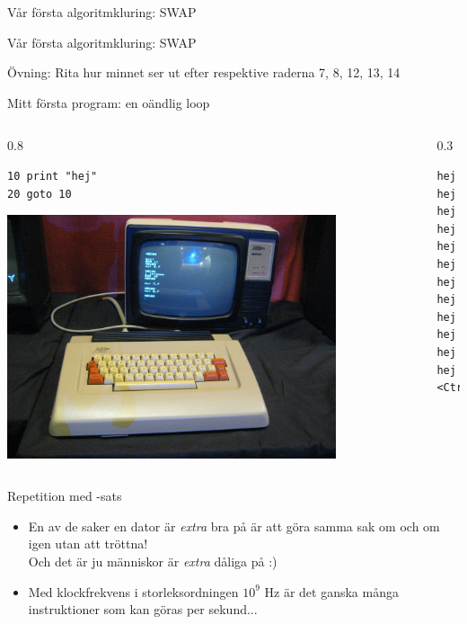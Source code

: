 \documentclass{lecturenotes}
\begin{document}
\begin{Slide}{Vår första algoritmkluring: SWAP}

\end{Slide}

\begin{Slide}{Vår första algoritmkluring: SWAP}

\footnotesize Övning: Rita hur minnet ser ut efter respektive raderna 7, 8, 12, 13, 14
\end{Slide}

\begin{Slide}{Mitt första program: en oändlig loop}
\begin{columns}
\begin{column}{0.8\textwidth}
\begin{verbatim}
10 print "hej"
20 goto 10
\end{verbatim}
\includegraphics[width=0.8\textwidth]{img/abc80.jpg}
\end{column}
\begin{column}{0.3\textwidth}
\pause
\begin{verbatim}
hej
hej
hej
hej
hej
hej
hej
hej
hej
hej
hej
hej
<Ctrl+C>
\end{verbatim}

\end{column}
\end{columns}
\end{Slide}

\begin{Slide}{Repetition med -sats}

\pause
\begin{itemize}
\item En av de saker en dator är \textit{extra} bra på är att göra samma sak om och om igen utan att tröttna! \\
Och det är ju människor är \textit{extra} dåliga på :)
\item Med klockfrekvens i storleksordningen $10^9$ Hz är det ganska många instruktioner som kan göras per sekund...
\end{itemize}
\end{Slide}
\end{document}
